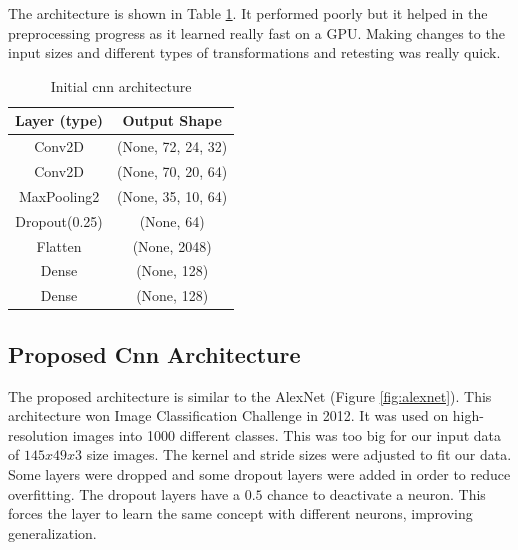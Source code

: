 The architecture is shown in Table \ref{table:initial}. It performed poorly but it helped in the preprocessing progress as it learned really fast on a GPU. Making changes to the input sizes and different types of transformations and retesting was really quick.


\begin{table} [h!]
	\centering
	\caption{Initial cnn architecture}
	\begin{tabular}{ |c|c|} 
		\hline
		Layer (type) & Output Shape  \\ \hline
		Conv2D &  (None, 72, 24, 32) \\ \hline
		Conv2D & (None, 70, 20, 64)\\ \hline
		MaxPooling2 & (None, 35, 10, 64) \\ \hline
		Dropout(0.25) & (None, 64)\\ \hline
		Flatten & (None, 2048) \\ \hline
		Dense & (None, 128) \\ \hline
		Dense & (None, 128) \\ \hline				
	\end{tabular}
	\label{table:initial}
\end{table}

\subsection{Proposed Cnn Architecture}
The proposed architecture is similar to the AlexNet \cite{alexnet} (Figure \ref{fig:alexnet}). This architecture won Image Classification Challenge in 2012. It was used on high-resolution images into 1000 different classes. This was too big for our input data of $145x49x3$ size images. The kernel and stride sizes were adjusted to fit our data. Some layers were dropped and some dropout layers were added in order to reduce overfitting. The dropout layers have a $0.5$ chance to deactivate a neuron. This forces the layer to learn the same concept with different neurons, improving generalization.
\par

